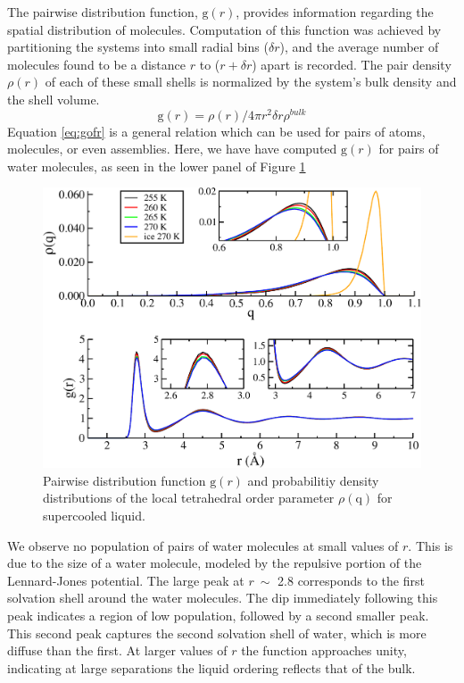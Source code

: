 The pairwise distribution function, $\mathrm{g}(r)$, provides
information regarding the spatial distribution of
molecules. Computation of this function was achieved by partitioning
the systems into small radial bins ($\delta r$), and the
average number of molecules found to be a distance $r$ to
($r + \delta r$) apart is recorded. The pair density
$\rho (r)$ of each of these small shells is normalized by the
system's bulk density and the shell volume.
\begin{equation}\label{eq:gofr}
\mathrm{g}(r) = \rho(r) / 4\pi r^2 \delta r \rho^{bulk}
\end{equation}
Equation \eqref{eq:gofr} is a general relation which can be used for
pairs of atoms, molecules, or even assemblies. Here, we have have
computed $\mathrm{g}(r)$ for pairs of water molecules, as
seen in the lower panel of Figure \ref{fig:gofrQ}

\begin{figure}
\includegraphics[width=\linewidth]{Figures/bulk_GofrQdens}
\caption{\label{fig:gofrQ} Pairwise distribution function
  $\mathrm{g}(r)$ and probabilitiy density distributions of
  the local tetrahedral order parameter $\rho (\mathrm{q})$ for
  supercooled liquid.}
\end{figure}  

We observe no population of pairs of water molecules at small values
of $r$. This is due to the size of a water molecule, modeled
by the repulsive portion of the Lennard-Jones potential. The large
peak at $r~\sim$ 2.8 corresponds to the first solvation
shell around the water molecules. The dip immediately following this
peak indicates a region of low population, followed by a second
smaller peak. This second peak captures the second solvation shell of
water, which is more diffuse than the first. At larger values of
$r$ the function approaches unity, indicating at large
separations the liquid ordering reflects that of the bulk. 

